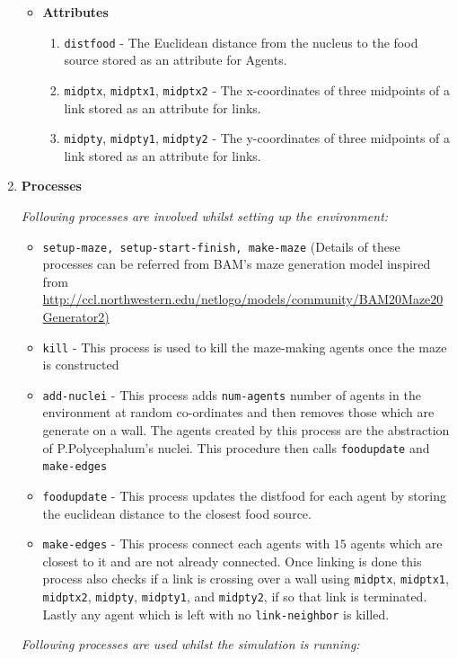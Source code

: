 \documentclass[a4paper, 11pt]{article}
\begin{document}
\begin{enumerate}
\begin{itemize}
    \item \textbf{Attributes}
    \begin{enumerate}
        \item \texttt{distfood} - The Euclidean distance from the nucleus to the food source stored as an attribute for Agents.
        \item \texttt{midptx}, \texttt{midptx1}, \texttt{midptx2} - The x-coordinates of three midpoints of a link stored as an attribute for links. 
        \item \texttt{midpty}, \texttt{midpty1}, \texttt{midpty2} - The y-coordinates of three midpoints of a link stored as an attribute for links.
    \end{enumerate}
    \end{itemize}
    \item \textbf{Processes}\par
    \textit{Following processes are involved whilst setting up the environment:}
    \begin{itemize}
        \item \texttt{setup-maze, setup-start-finish, make-maze} (Details of these processes can be referred from BAM's maze generation model inspired from \url{http://ccl.northwestern.edu/netlogo/models/community/BAM20Maze20Generator2)}
        \item \texttt{kill} - This process is used to kill the maze-making agents once the maze is constructed
        \item \texttt{add-nuclei} - This process adds \texttt{num-agents} number of agents in the environment at random co-ordinates and then removes those which are generate on a wall. The agents created by this process are the abstraction of P.Polycephalum's nuclei. This procedure then calls \texttt{foodupdate} and \texttt{make-edges}
        \item \texttt{foodupdate} - This process updates the distfood for each agent by storing the euclidean distance to the closest food source.
        \item \texttt{make-edges} - This process connect each agents with $15$ agents which are closest to it and are not already connected. Once linking is done this process also checks if a link is crossing over a wall using \texttt{midptx}, \texttt{midptx1}, \texttt{midptx2}, \texttt{midpty}, \texttt{midpty1}, and \texttt{midpty2}, if so that link is terminated. Lastly any agent which is left with no \texttt{link-neighbor} is killed.
    \end{itemize}
    \textit{Following processes are used whilst the simulation is running:}

\end{enumerate}
\end{document}
